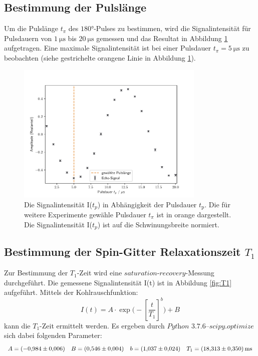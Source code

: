 \subsection{Bestimmung der Pulslänge}
\label{sec:pulslaenge}
Um die Pulslänge $t_{\pi}$ des $180°$-Pulses zu bestimmen, wird die Signalintensität für
Pulsdauern von $\SI{1}{\micro\second}$ bis $\SI{20}{\micro\second}$ gemessen und das
Resultat in Abbildung \ref{fig:pulslaenge} aufgetragen. Eine maximale Signalintensität
ist bei einer Pulsdauer $t_{\pi} = \SI{5}{\micro\second}$ zu beobachten (siehe gestrichelte
orangene Linie in Abbildung \ref{fig:pulslaenge}).

\begin{figure}[H]
    \centering
    \includegraphics[width=0.8\textwidth]{Auswertung/pulslaenge.pdf}
    \caption{Die Signalintensität I($t_p$) in Abhängigkeit der Pulsdauer $t_{\text{p}}$. Die für weitere
    Experimente gewähle Pulsdauer $t_{\pi}$ ist in orange dargestellt. Die Signalintensität I($t_p$)
    ist auf die Schwinungsbreite normiert.}
    \label{fig:pulslaenge}
\end{figure}

\subsection{Bestimmung der Spin-Gitter Relaxationszeit $T_1$}
\label{sec:T1}
Zur Bestimmung der $T_1$-Zeit wird eine $\textit{saturation-recovery}$-Messung
durchgeführt. Die gemessene Signalintensität I(t) ist in Abbildung \ref{fig:T1}
aufgeführt. Mittels der Kohlrauschfunktion:
\begin{equation}
    I(t) = A \cdot \exp\biggl(-\left[\frac{t}{T_1} \right]^b
    \biggr) + B
\end{equation}
\noindent
kann die $T_1$-Zeit ermittelt werden. Es ergeben durch
$\textit{Python 3.7.6--scipy.optimize}$ sich dabei folgenden Parameter:
\begin{equation*}
  A = \SI{-0,984\pm0,006}{}
  \quad
  B = \SI{0,546\pm0,004}{}
  \quad
  b = \SI{1,037\pm0,024}{}
  \quad
  T_1 = \SI{18.313\pm0.350}{\milli\second}
\end{equation*}
\noindent

